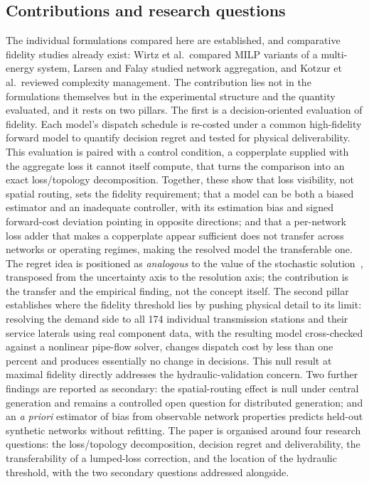 \documentclass[a4paper,fleqn]{cas-sc}
\providecommand{\citep}[1]{\cite{#1}}
\begin{document}
\subsection{Contributions and research questions}
The individual formulations compared here are established, and comparative fidelity studies
already exist: Wirtz et al.\ compared MILP variants of a multi-energy system, Larsen and
Falay studied network aggregation, and Kotzur et al.\ reviewed complexity management. The
contribution lies not in the formulations themselves but in the experimental structure and
the quantity evaluated, and it rests on two pillars. The first is a decision-oriented
evaluation of fidelity. Each model's dispatch schedule is re-costed under a common
high-fidelity forward model to quantify decision regret and tested for physical
deliverability. This evaluation is paired with a control condition, a copperplate supplied
with the aggregate loss it cannot itself compute, that turns the comparison into an exact
loss/topology decomposition. Together, these show that loss visibility, not spatial routing,
sets the fidelity requirement; that a model can be both a biased estimator and an inadequate
controller, with its estimation bias and signed forward-cost deviation pointing in opposite
directions; and that a per-network loss adder that makes a copperplate appear sufficient does
not transfer across networks or operating regimes, making the resolved model the transferable
one. The regret idea is positioned as \emph{analogous} to the value of the stochastic
solution~\citep{BirgeLouveaux2011}, transposed from the uncertainty axis to the resolution
axis; the contribution is the transfer and the empirical finding, not the concept itself.
The second pillar establishes where the fidelity threshold lies by pushing physical detail
to its limit: resolving the demand side to all 174 individual transmission stations and
their service laterals using real component data, with the resulting model cross-checked
against a nonlinear pipe-flow solver, changes dispatch cost by less than one percent and
produces essentially no change in decisions. This null result at maximal fidelity directly
addresses the hydraulic-validation concern. Two further findings are reported as secondary:
the spatial-routing effect is null under central generation and remains a controlled open
question for distributed generation; and an \emph{a priori} estimator of bias from observable
network properties predicts held-out synthetic networks without refitting. The paper is
organised around four research questions: the loss/topology decomposition, decision regret
and deliverability, the transferability of a lumped-loss correction, and the location of the
hydraulic threshold, with the two secondary questions addressed alongside.
\end{document}
